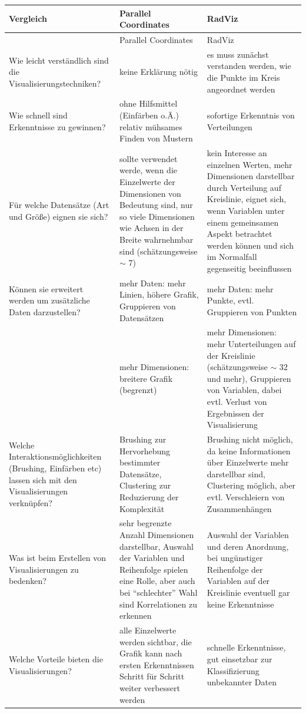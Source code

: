 \documentclass[a4paper,12pt,ngerman]{scrartcl}
\begin{document}
\begin{longtable} {| p{} | p{} | p{} |}
Vergleich & Parallel Coordinates & RadViz \\ \hline
\endfirsthead
 & Parallel Coordinates & RadViz\\  \hline
\endhead
Wie leicht verständlich sind die Visualisierungstechniken? & keine Erklärung nötig & es muss zunächst verstanden werden, wie die Punkte im Kreis angeordnet werden\\ \hline
Wie schnell sind Erkenntnisse zu gewinnen? & ohne Hilfsmittel (Einfärben o.Ä.) relativ mühsames Finden von Mustern & sofortige Erkenntnis von Verteilungen\\ \hline
Für welche Datensätze (Art und Größe) eignen sie sich? & sollte verwendet werde, wenn die Einzelwerte der Dimensionen von Bedeutung sind, nur so viele Dimensionen wie Achsen in der Breite wahrnehmbar sind (schätzungsweise $\sim$ 7) & kein Interesse an einzelnen Werten, mehr Dimensionen darstellbar durch Verteilung auf Kreislinie, eignet sich, wenn Variablen unter einem gemeinsamen Aspekt betrachtet werden können und sich im Normalfall gegenseitig beeinflussen \\ \hline
Können sie erweitert werden um zusätzliche Daten darzustellen? & mehr Daten: mehr Linien, höhere Grafik, Gruppieren von Datensätzen & mehr Daten: mehr Punkte, evtl. Gruppieren von Punkten \\
& mehr Dimensionen: breitere Grafik (begrenzt) & mehr Dimensionen: mehr Unterteilungen auf der Kreislinie (schätzungsweise $\sim$ 32 und mehr), Gruppieren von Variablen, dabei evtl. Verlust von Ergebnissen der Visualisierung\\ \hline
Welche Interaktionsmöglichkeiten (Brushing, Einfärben etc) lassen sich mit den Visualisierungen
verknüpfen? & Brushing zur Hervorhebung bestimmter Datensätze, Clustering zur Reduzierung der Komplexität & Brushing nicht möglich, da keine Informationen über Einzelwerte mehr darstellbar sind, Clustering möglich, aber evtl. Verschleiern von Zusammenhängen \\ \hline
Was ist beim Erstellen von Visualisierungen zu bedenken? & sehr begrenzte Anzahl Dimensionen darstellbar, Auswahl der Variablen und Reihenfolge spielen eine Rolle, aber auch bei \enquote{schlechter} Wahl sind Korrelationen zu erkennen & Auswahl der Variablen und deren Anordnung, bei ungünstiger Reihenfolge der Variablen auf der Kreislinie eventuell gar keine Erkenntnisse\\ \hline
Welche Vorteile bieten die Visualisierungen? & alle Einzelwerte werden sichtbar, die Grafik kann nach ersten Erkenntnissen Schritt für Schritt weiter verbessert werden & schnelle Erkenntnisse, gut einsetzbar zur Klassifizierung unbekannter Daten\\ \hline
\end{longtable}
\end{document}
